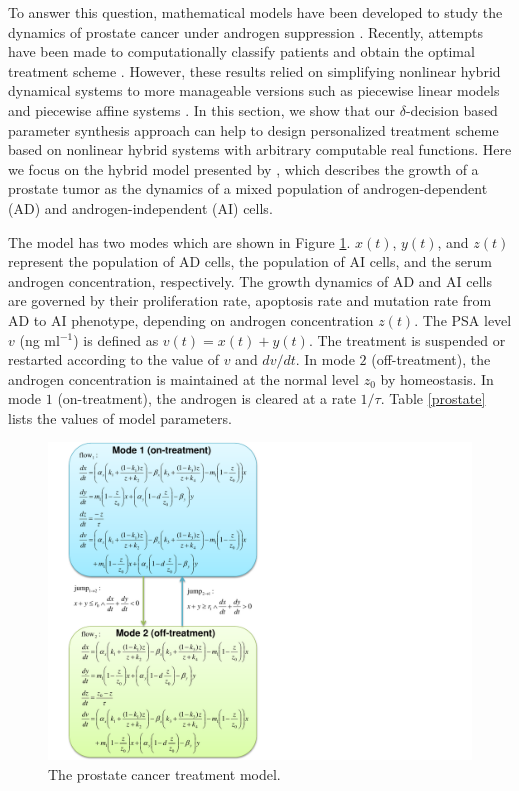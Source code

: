 To answer this question, mathematical models have been developed to study the dynamics of prostate cancer under androgen suppression \citep{jackson04,ideta08, hirata10,pnas11}. Recently, attempts have been made to computationally classify patients and obtain the optimal treatment scheme \citep{chaos10,suzuki10}. However, these results relied on simplifying nonlinear hybrid dynamical systems to more manageable versions such as piecewise linear models \citep{chaos10} and piecewise affine systems \citep{suzuki10}. In this section, we show that our $\delta$-decision based parameter synthesis approach can help to design personalized treatment scheme based on nonlinear hybrid systems with arbitrary computable real functions. Here we focus on the hybrid model presented by \cite{ideta08}, which describes the growth of a prostate tumor as the dynamics of a mixed population of androgen-dependent (AD) and androgen-independent (AI) cells. 

The model has two modes which are shown in Figure \ref{pmodel}. $x(t)$, $y(t)$, and $z(t)$ represent the population of AD cells, the population of AI cells, and the serum androgen concentration, respectively. The growth dynamics of AD and AI cells are governed by their proliferation rate, apoptosis rate and mutation rate from AD to AI phenotype, depending on androgen concentration $z(t)$. The PSA level $v$ (ng ml$^{-1}$) is defined as $v(t)=x(t)+y(t)$. The treatment is suspended or restarted according to the value of $v$ and ${dv}/{dt}$. In mode $2$ (off-treatment), the androgen concentration is maintained at the normal level $z_0$ by homeostasis. In mode $1$ (on-treatment), the androgen is cleared at a rate $1/\tau$. Table \ref{prostate} lists the values of model parameters.

\begin{figure}[htb]
\centering
\includegraphics[scale=0.5]{fig-prostate}
\caption{The prostate cancer treatment model.}
\label{pmodel}
 \vspace{-0.7cm}
\end{figure}




